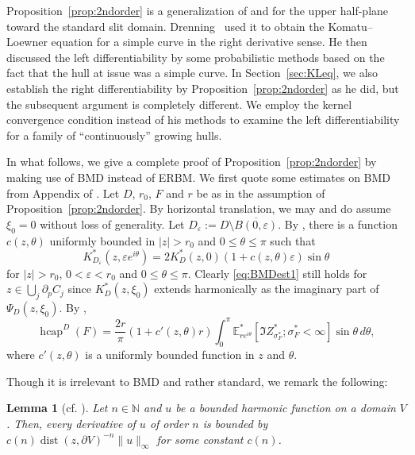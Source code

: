 \documentclass[preprint,12pt]{elsarticle}
\newtheorem{lem}[thm]{Lemma}
\theoremstyle{definition}
\newcommand{\N}{\mathbb{N}}
\newcommand{\mean}[3]{\mathbb{E}^{#1}_{#2}\left[ #3 \right]}
\DeclareMathOperator{\dist}{dist}
\DeclareMathOperator{\hcap}{hcap}
\begin{document}
Proposition~\ref{prop:2ndorder} is a generalization of \cite[Lemma~2.7]{LSW01}
and \cite[Proposition~3.46]{La05} for the upper half-plane
toward the standard slit domain.
Drenning~\cite{Dr11} used it to obtain the Komatu--Loewner equation
for a simple curve in the right derivative sense.
He then discussed the left differentiability by some probabilistic methods
based on the fact that the hull at issue was a simple curve.
In Section~\ref{sec:KLeq}, we also establish the right differentiability
by Proposition~\ref{prop:2ndorder} as he did,
but the subsequent argument is completely different.
We employ the kernel convergence condition instead of his methods
to examine the left differentiability for a family of ``continuously'' growing hulls.

In what follows, we give a complete proof
of Proposition~\ref{prop:2ndorder} by making use of BMD instead of ERBM.
We first quote some estimates on BMD from Appendix of \cite{CF18}.
Let $D$, $r_0$, $F$ and $r$ be as in the assumption
of Proposition~\ref{prop:2ndorder}.
By horizontal translation, we may and do assume $\xi_0=0$
without loss of generality.
Let $D_{\varepsilon}:=D \setminus \overline{B(0,\varepsilon)}$.
By \cite[Proposition~A.2]{CF18}, there is a function $c(z, \theta)$
uniformly bounded in $\lvert z \rvert>r_0$ and $0 \leq \theta \leq \pi$
such that
\begin{equation} \label{eq:BMDest1}
K^*_{D_{\varepsilon}}(z, \varepsilon e^{i\theta})
=2K^*_D(z,0)(1+c(z,\theta)\varepsilon)\sin\theta
\end{equation}
for $\lvert z \rvert>r_0$, $0<\varepsilon<r_0$ and $0 \leq \theta \leq \pi$.
Clearly \eqref{eq:BMDest1} still holds for $z \in \bigcup_j \partial_p C_j$
since $K^*_D(z, \xi_0)$ extends harmonically
as the imaginary part of $\Psi_D(z, \xi_0)$.
By \cite[(A.22) and (A.23)]{CF18},
\begin{equation} \label{eq:BMDest2}
\hcap^D(F)=\frac{2r}{\pi}(1+c'(z,\theta)r)\int_0^{\pi}
\mean{*}{re^{i\theta}}{\Im Z^*_{\sigma^*_F}; \sigma^*_F<\infty}\sin\theta \,d\theta,
\end{equation}
where $c'(z,\theta)$ is a uniformly bounded function in $z$ and $\theta$.

Though it is irrelevant to BMD and rather standard, we remark the following:

\begin{lem}[cf. {\cite[Exercise~2.17]{La05}}] \label{lem:hbound}
Let $n \in \N$ and $u$ be a bounded harmonic function on a domain $V$.
Then, every derivative of $u$ of order $n$ is bounded by
$c(n)\dist(z,\partial V)^{-n}\lVert u \rVert_{\infty}$ for some constant $c(n)$.
\end{lem}
\end{document}
